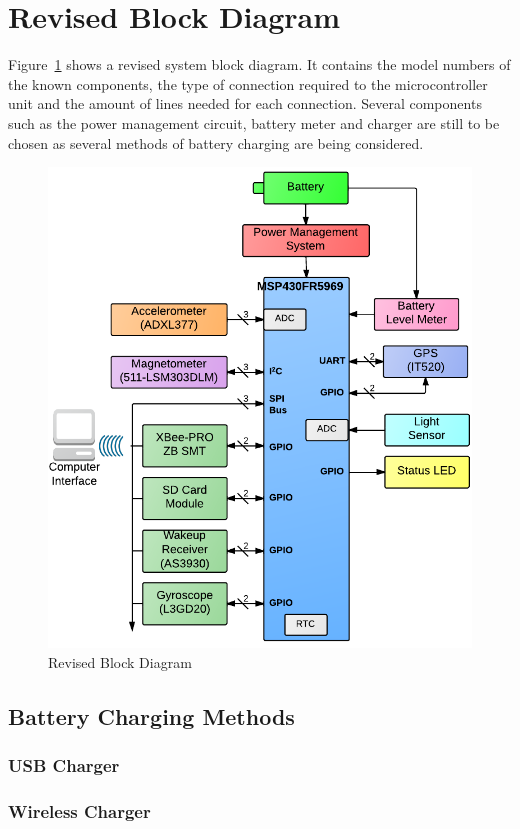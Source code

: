 \section{Revised Block Diagram}

Figure~\ref{fig:blockDiagram} shows a revised system block diagram.  It contains the model numbers of the known components, the type of connection required to the microcontroller unit and the amount of lines needed for each connection.  Several components such as the power management circuit, battery meter and charger are still to be chosen as several methods of battery charging are being considered.

\begin{figure}[H]
	\centering
	\includegraphics[width=\textwidth]{img/blockDiagramV2_2}
	\caption{Revised Block Diagram \label{fig:blockDiagram}}
\end{figure}

\subsection{Battery Charging Methods}
\subsubsection{USB Charger}
\subsubsection{Wireless Charger}
